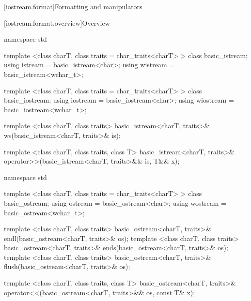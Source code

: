 [iostream.format]{Formatting and manipulators}

[iostream.format.overview]{Overview}

%

\begin{codeblock}
namespace std {
  template <class charT, class traits = char_traits<charT> >
    class basic_istream;
  using istream  = basic_istream<char>;
  using wistream = basic_istream<wchar_t>;

  template <class charT, class traits = char_traits<charT> >
    class basic_iostream;
  using iostream  = basic_iostream<char>;
  using wiostream = basic_iostream<wchar_t>;

  template <class charT, class traits>
    basic_istream<charT, traits>& ws(basic_istream<charT, traits>& is);

  template <class charT, class traits, class T>
    basic_istream<charT, traits>&
    operator>>(basic_istream<charT, traits>&& is, T&& x);
}
\end{codeblock}

%
%
%
%

%

\begin{codeblock}
namespace std {
  template <class charT, class traits = char_traits<charT> >
    class basic_ostream;
  using ostream  = basic_ostream<char>;
  using wostream = basic_ostream<wchar_t>;

  template <class charT, class traits>
    basic_ostream<charT, traits>& endl(basic_ostream<charT, traits>& os);
  template <class charT, class traits>
    basic_ostream<charT, traits>& ends(basic_ostream<charT, traits>& os);
  template <class charT, class traits>
    basic_ostream<charT, traits>& flush(basic_ostream<charT, traits>& os);

  template <class charT, class traits, class T>
    basic_ostream<charT, traits>&
    operator<<(basic_ostream<charT, traits>&& os, const T& x);
}
\end{codeblock}

%
%
%
%

